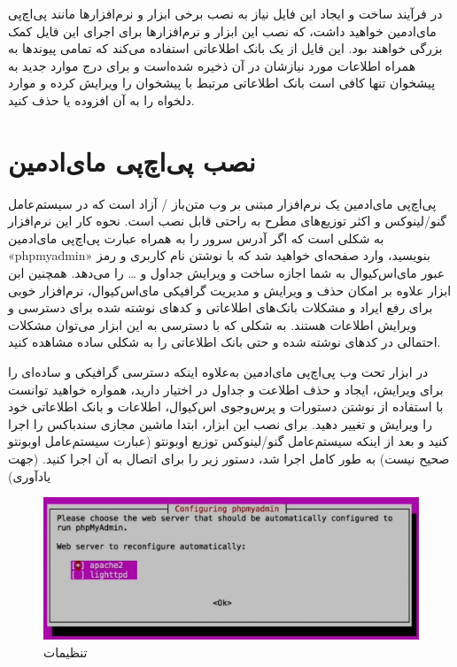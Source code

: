 در فرآیند ساخت و ایجاد این فایل نیاز به  نصب برخی ابزار و نرم‌افزارها مانند پی‌اچ‌پی مای‌ادمین خواهید داشت، که نصب این ابزار و نرم‌افزارها برای اجرای این فایل کمک بزرگی خواهند بود. این فایل از یک بانک اطلاعاتی استفاده می‌کند که تمامی پیوندها به همراه اطلاعات مورد نیازشان در آن ذخیره شده‌است و برای درج موارد جدید به پیشخوان تنها کافی است بانک اطلاعاتی مرتبط با پیشخوان را ویرایش کرده و موارد دلخواه را به آن افزوده یا حذف کنید.
\section{نصب پی‌اچ‌پی مای‌ادمین
     }
پی‌اچ‌پی مای‌ادمین یک نرم‌افزار مبتنی بر وب متن‌باز / آزاد است که در سیستم‌عامل گنو/لینوکس و اکثر توزیع‌های مطرح به راحتی قابل نصب است. نحوه کار این نرم‌افزار به شکلی است که اگر آدرس سرور را به همراه عبارت پی‌اچ‌پی مای‌ادمین «phpmyadmin» بنویسید، وارد صفحه‌ای خواهید شد که با نوشتن نام کاربری و رمز عبور مای‌اس‌کیوال به شما اجازه ساخت و ویرایش جداول و … را می‌دهد. همچنین ابن ابزار علاوه بر امکان حذف و ویرایش و مدیریت گرافیکی مای‌اس‌کیوال، نرم‌افزار خوبی برای رفع ایراد و مشکلات بانک‌های اطلاعاتی و کدهای نوشته شده برای دسترسی و ویرایش اطلاعات هستند. به شکلی که با دسترسی به این ابزار می‌توان مشکلات احتمالی در کدهای نوشته شده و حتی بانک اطلاعاتی را به شکلی ساده مشاهده کنید.

در ابزار تحت وب پی‌اچ‌پی مای‌ادمین به‌علاوه اینکه دسترسی گرافیکی و ساده‌ای را برای ویرایش، ایجاد و حذف اطلاعت و جداول در اختیار دارید، همواره خواهید توانست با استفاده از نوشتن دستورات و پرس‌وجوی اس‌کیوال، اطلاعات و بانک اطلاعاتی خود را ویرایش و تغییر دهید. برای نصب این ابزار، ابتدا ماشین مجازی سندباکس را اجرا کنید و بعد از اینکه سیستم‌عامل گنو/لینوکس توزیع اوبونتو (عبارت سیستم‌عامل اوبونتو صحیح نیست) به طور کامل اجرا شد، دستور زیر را برای اتصال به آن اجرا کنید. (جهت یادآوری)
\begin{figure}
    \includegraphics[width=.9\textwidth ,height=.35\textwidth]{Pic/PHPADMIN}
    \caption{ تنظیمات 
    }
    \label{PHPMyAdmin}
\end{figure}


